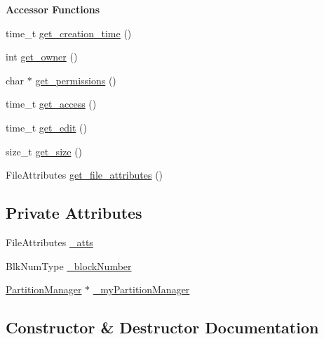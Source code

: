 \begin{Indent}\textbf{ Accessor Functions}\par
\begin{DoxyCompactItemize}
\item 
time\+\_\+t \mbox{\hyperlink{class_attributes_aeb0845464130e292875be4f8dcc51e8a}{get\+\_\+creation\+\_\+time}} ()
\item 
int \mbox{\hyperlink{class_attributes_a8b9efe0186ccf74b4b08c4031a99f5bb}{get\+\_\+owner}} ()
\item 
char $\ast$ \mbox{\hyperlink{class_attributes_a52a8dc1b5d9c4c1eb19bcb336705cc42}{get\+\_\+permissions}} ()
\item 
time\+\_\+t \mbox{\hyperlink{class_attributes_a9cd0c49733d3de43a8916a318ba62bc1}{get\+\_\+access}} ()
\item 
time\+\_\+t \mbox{\hyperlink{class_attributes_a4ff80c2f3a31f86d874d7982354e4f70}{get\+\_\+edit}} ()
\item 
size\+\_\+t \mbox{\hyperlink{class_attributes_a6e5df8252fc902c0fbe22058fe0b4fb1}{get\+\_\+size}} ()
\item 
File\+Attributes \mbox{\hyperlink{class_attributes_a774666651c1d61cade39cc15cf03b9b2}{get\+\_\+file\+\_\+attributes}} ()
\end{DoxyCompactItemize}
\end{Indent}
\subsection*{Private Attributes}
\begin{DoxyCompactItemize}
\item 
File\+Attributes \mbox{\hyperlink{class_attributes_adb049fd16001d1634a6534917dcaf8c3}{\+\_\+atts}}
\item 
Blk\+Num\+Type \mbox{\hyperlink{class_attributes_a58984b59c6cf95453f54824113a95d67}{\+\_\+block\+Number}}
\item 
\mbox{\hyperlink{class_partition_manager}{Partition\+Manager}} $\ast$ \mbox{\hyperlink{class_attributes_ae344a55e94b87cbc3cb9e956f5753eee}{\+\_\+my\+Partition\+Manager}}
\end{DoxyCompactItemize}


\subsection{Constructor \& Destructor Documentation}
\mbox{\label{class_attributes_a0d6b154029e34f811f0930806768f022}} 
